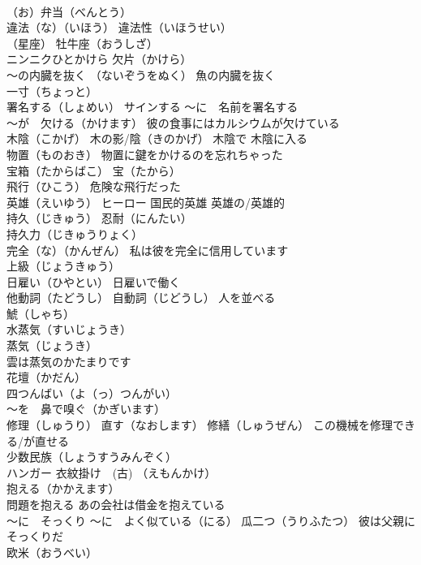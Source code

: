 \documentclass[8pt]{extreport}
\begin{document}
\begin{CJK}{UTF8}{min}
\\	（お）弁当（べんとう）
\\	違法（な）（いほう） 違法性（いほうせい）
\\	（星座）	牡牛座（おうしざ）
\\	ニンニクひとかけら 欠片（かけら）
\\	～の内臓を抜く （ないぞうをぬく） 魚の内臓を抜く
\\	一寸（ちょっと）
\\	署名する（しょめい） サインする ～に　名前を署名する
\\	～が　欠ける（かけます） 彼の食事にはカルシウムが欠けている
\\	木陰（こかげ） 木の影/陰（きのかげ） 木陰で 木陰に入る
\\	物置（ものおき） 物置に鍵をかけるのを忘れちゃった
\\	宝箱（たからばこ） 宝（たから）
\\	飛行（ひこう） 危険な飛行だった
\\	英雄（えいゆう） ヒーロー 国民的英雄 英雄の/英雄的
\\	持久（じきゅう） 忍耐（にんたい）
\\	持久力（じきゅうりょく）
\\	完全（な）（かんぜん） 私は彼を完全に信用しています
\\	上級（じょうきゅう）
\\	日雇い（ひやとい） 日雇いで働く
\\	他動詞（たどうし） 自動詞（じどうし） 人を並べる
\\	鯱（しゃち）
\\	水蒸気（すいじょうき）
\\	蒸気（じょうき）
\\	雲は蒸気のかたまりです
\\	花壇（かだん）
\\	四つんばい（よ（っ）つんがい）
\\	～を　鼻で嗅ぐ（かぎいます）
\\	修理（しゅうり） 直す（なおします） 修繕（しゅうぜん） この機械を修理できる/が直せる
\\	少数民族（しょうすうみんぞく）
\\	ハンガー 衣紋掛け　(古) （えもんかけ）
\\	抱える（かかえます） 
\\	問題を抱える あの会社は借金を抱えている
\\	～に　そっくり ～に　よく似ている（にる） 瓜二つ（うりふたつ） 彼は父親にそっくりだ
\\	欧米（おうべい）

\end{CJK}
\end{document}
